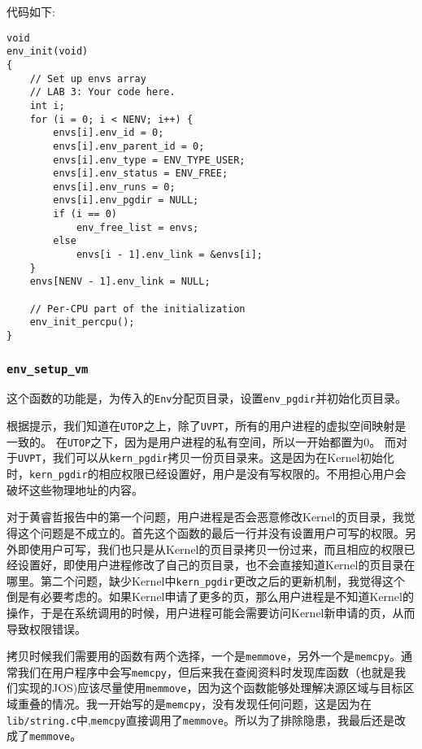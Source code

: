 \documentclass[11pt]{article}
\begin{document}
代码如下:
\begin{lstlisting}[title=kern/env.c]
void
env_init(void)
{
	// Set up envs array
	// LAB 3: Your code here.
	int i;
	for (i = 0; i < NENV; i++) {
		envs[i].env_id = 0;
		envs[i].env_parent_id = 0;
		envs[i].env_type = ENV_TYPE_USER;
		envs[i].env_status = ENV_FREE;
		envs[i].env_runs = 0;
		envs[i].env_pgdir = NULL;
		if (i == 0)
			env_free_list = envs;
		else
			envs[i - 1].env_link = &envs[i]; 
	}
	envs[NENV - 1].env_link = NULL;

	// Per-CPU part of the initialization
	env_init_percpu();
}
\end{lstlisting}

\subsubsection{\lstinline|env_setup_vm|}
这个函数的功能是，为传入的\lstinline|Env|分配页目录，设置\lstinline|env_pgdir|并初始化页目录。

根据提示，我们知道在\lstinline|UTOP|之上，除了\lstinline|UVPT|，所有的用户进程的虚拟空间映射是一致的。
在\lstinline|UTOP|之下，因为是用户进程的私有空间，所以一开始都置为0。
而对于\lstinline|UVPT|，我们可以从\lstinline|kern_pgdir|拷贝一份页目录来。这是因为在Kernel初始化时，\lstinline|kern_pgdir|的相应权限已经设置好，用户是没有写权限的。不用担心用户会破坏这些物理地址的内容。

对于黄睿哲报告中的第一个问题，用户进程是否会恶意修改Kernel的页目录，我觉得这个问题是不成立的。首先这个函数的最后一行并没有设置用户可写的权限。另外即使用户可写，我们也只是从Kernel的页目录拷贝一份过来，而且相应的权限已经设置好，即使用户进程修改了自己的页目录，也不会直接知道Kernel的页目录在哪里。第二个问题，缺少Kernel中\lstinline|kern_pgdir|更改之后的更新机制，我觉得这个倒是有必要考虑的。如果Kernel申请了更多的页，那么用户进程是不知道Kernel的操作，于是在系统调用的时候，用户进程可能会需要访问Kernel新申请的页，从而导致权限错误。

拷贝时候我们需要用的函数有两个选择，一个是\lstinline|memmove|，另外一个是\lstinline|memcpy|。通常我们在用户程序中会写\lstinline|memcpy|，但后来我在查阅资料时发现库函数（也就是我们实现的JOS)应该尽量使用\lstinline|memmove|，因为这个函数能够处理解决源区域与目标区域重叠的情况。我一开始写的是\lstinline|memcpy|，没有发现任何问题，这是因为在\lstinline|lib/string.c|中,\lstinline|memcpy|直接调用了\lstinline|memmove|。所以为了排除隐患，我最后还是改成了\lstinline|memmove|。
\end{document}

